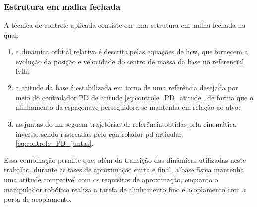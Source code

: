 
\subsubsection{Estrutura em malha fechada}

A técnica de controle aplicada consiste em uma estrutura em malha fechada na qual:

\begin{enumerate}
\item a dinâmica orbital relativa é descrita pelas equações de \gls{hcw}, que fornecem a evolução da posição e velocidade do centro de massa da base no referencial \gls{lvlh};
\item a atitude da base é estabilizada em torno de uma referência desejada por meio do controlador PD de atitude \eqref{eq:controle_PD_atitude}, de forma que o alinhamento da espaçonave perseguidora se mantenha em relação ao alvo;
\item as juntas do \gls{mr} seguem trajetórias de referência obtidas pela cinemática inversa, sendo rastreadas pelo controlador \gls{pd} articular \eqref{eq:controle_PD_juntas}.
\end{enumerate}

Essa combinação permite que, além da transição das dinâmicas utilizadas neste trabalho, durante as fases de aproximação curta e final, a base física mantenha uma atitude compatível com os requisitos de aproximação, enquanto o manipulador robótico realiza a tarefa de alinhamento fino e acoplamento com a porta de acoplamento.
